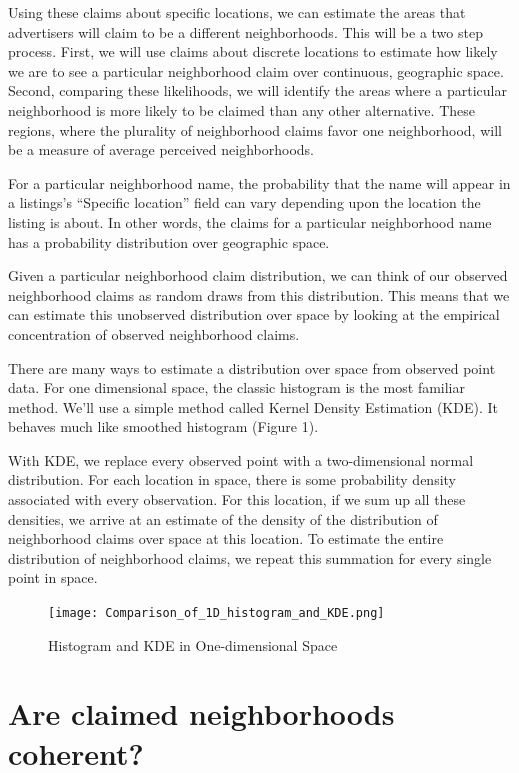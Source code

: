 \documentclass[12pt,letter]{article}\usepackage[]{graphicx}\usepackage[]{color}
\let\cite=\citep
\begin{document}
Using these claims about specific locations, we can estimate the areas
that advertisers will claim to be a different neighborhoods. This will
be a two step process. First, we will use claims about discrete
locations to estimate how likely we are to see a particular
neighborhood claim over continuous, geographic space. Second,
comparing these likelihoods, we will identify the areas where a
particular neighborhood is more likely to be claimed than any other
alternative. These regions, where the plurality of neighborhood claims
favor one neighborhood, will be a measure of average perceived
neighborhoods.

For a particular neighborhood name, the probability that the name will
appear in a listings's ``Specific location'' field can vary depending
upon the location the listing is about. In other words, the claims for
a particular neighborhood name has a probability distribution over
geographic space. 

Given a particular neighborhood claim distribution, we can think of
our observed neighborhood claims as random draws from this
distribution. This means that we can estimate this unobserved
distribution over space by looking at the empirical concentration of
observed neighborhood claims. 

There are many ways to estimate a distribution over space from
observed point data. For one dimensional space, the classic histogram
is the most familiar method. We'll use a simple method called Kernel
Density Estimation (KDE). It behaves much like smoothed histogram
(Figure 1).

With KDE, we replace every observed point with a two-dimensional
normal distribution. For each location in space, there is some
probability density associated with every observation. For this
location, if we sum up all these densities, we arrive at an estimate
of the density of the distribution of neighborhood claims over space
at this location. To estimate the entire distribution of neighborhood
claims, we repeat this summation for every single point in space.

\begin{figure}
\texttt{[image: Comparison\_of\_1D\_histogram\_and\_KDE.png]}
\caption{Histogram and KDE in One-dimensional Space \cite{wikipedia}}
\end{figure}

\section*{Are claimed neighborhoods coherent?}
\end{document}
